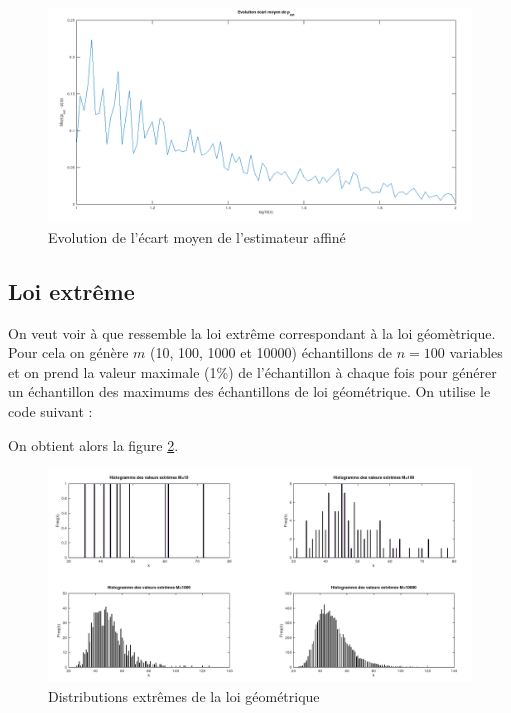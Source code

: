 \documentclass[12pt,a4paper,titlepage]{article}
\numberwithin{equation}{section}
\begin{document}
\begin{figure}[!h]
\begin{center}
 \includegraphics[scale=0.3]{images/biaisMoyGeomBis.png} 
\end{center}
 \caption{Evolution de l'écart moyen de l'estimateur affiné}
 \label{Evolution de l'ecart moyen de de l'estimateur affiné geom}
\end{figure}


\subsection{Loi extrême}

On veut voir à que ressemble la loi extrême correspondant à la loi géomètrique. Pour cela on génère $m$ (10, 100, 1000 et 10000) échantillons de $n=100$ variables et on prend la valeur maximale (1\%) de l'échantillon à chaque fois pour générer un échantillon des maximums des échantillons de loi géométrique. On utilise le code suivant :



On obtient alors la figure \ref{Distributions extrêmes de la loi géométrique}.

\begin{figure}[!h]
\begin{center}
 \includegraphics[scale=0.3]{images/extremGeom.png} 
\end{center}
 \caption{Distributions extrêmes de la loi géométrique}
 \label{Distributions extrêmes de la loi géométrique}
\end{figure}
\end{document}
